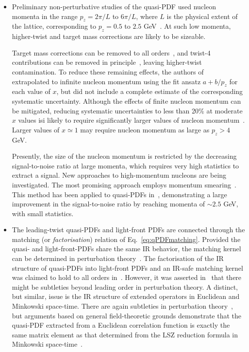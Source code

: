 \begin{itemize}
\item Preliminary non-perturbative studies of the quasi-PDF used nucleon 
momenta in the range $p_z = 2\pi/L$ to $6\pi/L$, where $L$ is the physical 
extent of the lattice, corresponding to $p_z = 0.5$ to $2.5$ 
GeV~\cite{Lin:2014zya,Alexandrou:2015rja,Chen:2016utp,Alexandrou:2016jqi}. 
%
At such low momenta, higher-twist and target mass corrections are likely 
to be sizeable.

Target mass corrections can be removed to all orders~\cite{Chen:2016utp}, 
and twist-4 contributions can be removed in 
principle~\cite{Radyushkin:2016hsy,Chen:2016utp}, 
leaving higher-twist contamination. 
%
To reduce these remaining effects, the authors 
of~\cite{Lin:2014zya,Chen:2016utp} extrapolated to infinite nucleon momentum 
using the fit ansatz $a + b/p_z$ for each value of $x$, but did not include 
a complete estimate of the corresponding systematic uncertainty. 
%
Although the effects of finite nucleon momentum can be mitigated, reducing 
systematic uncertainties to less than 20\% at moderate $x$ values isi likely 
to require significantly larger values of nucleon 
momentum~\cite{Gamberg:2014zwa}.
%
Larger values of $x\simeq 1$ may require nucleon momentum 
as large as $p_z > 4$ GeV.

Presently, the size of the nucleon momentum is restricted by the decreasing 
signal-to-noise ratio at large momenta, which requires very high statistics 
to extract a signal. 
%
New approaches to high-momentum nucleons are being investigated.
% 
The most promising approach employs momentum smearing~\cite{Bali:2016lva}. 
%
This method has been applied to quasi-PDFs in~\cite{Alexandrou:2016jqi}, 
demonstrating a large improvement in the signal-to-noise ratio by reaching 
momenta of $\sim 2.5$ GeV, with small statistics.

\item The leading-twist quasi-PDFs and light-front PDFs are connected through
the matching (or {\it factorisation}) relation of Eq.~\eqref{eq:qPDFmatching}. 
%
Provided the quasi- and light-front-PDFs share the same IR behavior, 
the matching kernel can be determined in perturbation 
theory~\cite{Xiong:2013bka}. 
%
The factorisation of the IR structure of quasi-PDFs into light-front PDFs 
and an IR-safe matching kernel was claimed to hold to all orders 
in~\cite{Ma:2014jla, Ma:2014jga}. 
%
However, it was asserted in~\cite{Li:2016amo} that there might be subtleties 
beyond leading order in perturbation theory. 
%
A distinct, but similar, issue is the IR structure of extended operators in 
Euclidean and Minkowski space-time. 
%
There are again subtleties in perturbation theory~\cite{Carlson:2017gpk}, 
but arguments based on general field-theoretic grounds demonstrate that the 
quasi-PDF extracted from a Euclidean correlation function is exactly the same 
matrix element as that determined from the LSZ reduction formula in Minkowski 
space-time~\cite{Briceno:2017cpo}.


\end{itemize}
